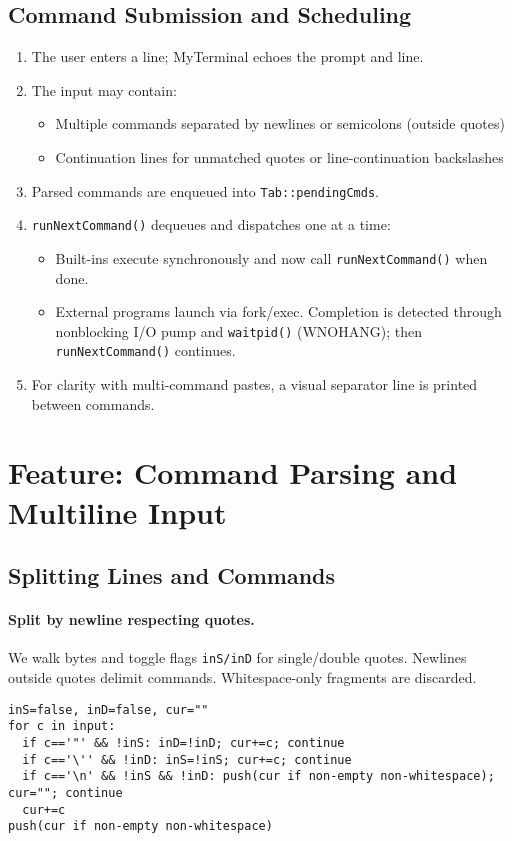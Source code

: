 \documentclass[11pt,a4paper]{article}
\begin{document}
\subsection{Command Submission and Scheduling}
\begin{enumerate}[leftmargin=*]
\item The user enters a line; MyTerminal echoes the prompt and line.
\item The input may contain:
  \begin{itemize}
    \item Multiple commands separated by newlines or semicolons (outside quotes)
    \item Continuation lines for unmatched quotes or line-continuation backslashes
  \end{itemize}
\item Parsed commands are enqueued into \texttt{Tab::pendingCmds}.
\item \texttt{runNextCommand()} dequeues and dispatches one at a time:
  \begin{itemize}
    \item Built-ins execute synchronously and now call \texttt{runNextCommand()} when done.
    \item External programs launch via fork/exec. Completion is detected through nonblocking I/O pump and \texttt{waitpid()} (WNOHANG); then \texttt{runNextCommand()} continues.
  \end{itemize}
\item For clarity with multi-command pastes, a visual separator line is printed between commands.
\end{enumerate}


\section{Feature: Command Parsing and Multiline Input}

\subsection{Splitting Lines and Commands}
\paragraph{Split by newline respecting quotes.} We walk bytes and toggle flags \texttt{inS/inD} for single/double quotes. Newlines outside quotes delimit commands. Whitespace-only fragments are discarded.
\begin{lstlisting}[style=code]
inS=false, inD=false, cur=""
for c in input:
  if c=='"' && !inS: inD=!inD; cur+=c; continue
  if c=='\'' && !inD: inS=!inS; cur+=c; continue
  if c=='\n' && !inS && !inD: push(cur if non-empty non-whitespace); cur=""; continue
  cur+=c
push(cur if non-empty non-whitespace)
\end{lstlisting}
\end{document}
